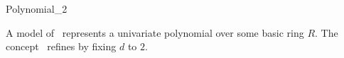 \begin{ccRefConcept}{Polynomial_2}

\ccDefinition

A model of \ccRefName\ represents a univariate polynomial over some basic ring 
$R$. The concept \ccRefName\ refines  by fixing $d$ to $2$.

\ccRefines

\\

\ccSeeAlso 

\\
\\
\\

\ccHasModels

\end{ccRefConcept}